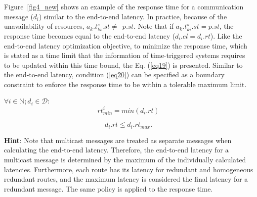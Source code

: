     Figure~\ref{fig4_new} shows an example of the response time for a communication message ($d_i$) similar to the end-to-end latency. 
    In practice, because of the unavailability of resources, $a_k.t_{ki}^{s}.st \neq $~$p.st$. Note that if $a_k.t_{ki}^{s}.st = p.st$, the response time becomes equal to the end-to-end latency ($d_i.el = d_i.rt$). Like the end-to-end latency optimization objective, to minimize the response time, which is stated as a time limit that the information of time-triggered systems requires to be updated within this time bound, the Eq. (\ref{eq19}) is presented. Similar to the end-to-end latency, condition (\ref{eq20}) can be specified as a boundary constraint to enforce the response time to be within a tolerable maximum limit.\newline
    
    
    
    
    $\forall i \in \mathbb{N}; d_i \in\mathcal{D}$:
    \begin{equation}
         rt^{i}_{min} = min ({d_i.rt})  
    	\label{eq19}
    \end{equation}

    \begin{equation}
    	d_i.rt \leq d_i.rt_{max}.
    	\label{eq20}
    \end{equation}\newline
    

   \textbf{Hint}: Note that multicast messages are treated as separate messages when calculating the end-to-end latency. Therefore, the end-to-end latency for a multicast message is determined by the maximum of the individually calculated latencies. Furthermore, each route has its latency for redundant and homogeneous redundant routes, and the maximum latency is considered the final latency for a redundant message. The same policy is applied to the response time.
    

